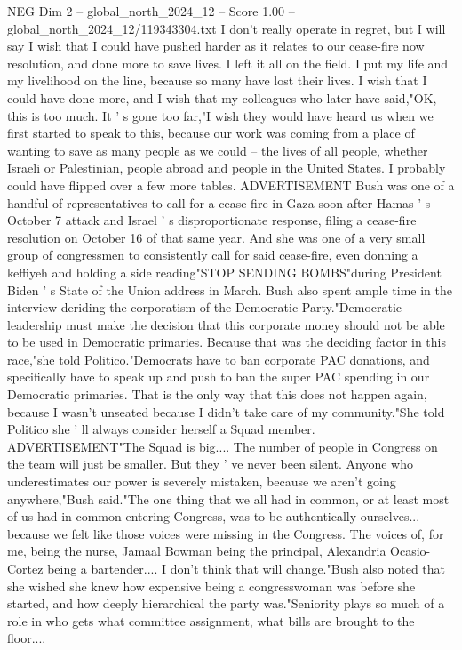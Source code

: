 \begin{textsample}{NEG Dim 2 – global\_north\_2024\_12 – Score 1.00 – global\_north\_2024\_12/119343304.txt}  \label{ex:f2_neg_266}
I don't really operate in regret, but I will say I wish that I could have pushed harder as it relates to our cease-fire now resolution, and done more to save lives.
I left it all on the field.
I put my life and my livelihood on the line, because so many have lost their lives.
I wish that I could have done more, and I wish that my colleagues who later have said,"OK, this is too much.
It ' s gone too far,"I wish they would have heard us when we first started to speak to this, because our work was coming from a place of wanting to save as many people as we could -- the lives of all people, whether Israeli or Palestinian, people abroad and people in the United States.
I probably could have flipped over a few more tables.
ADVERTISEMENT Bush was one of a handful of representatives to call for a cease-fire in Gaza soon after Hamas ' s October 7 attack and Israel ' s disproportionate response, filing a cease-fire resolution on October 16 of that same year.
And she was one of a very small group of congressmen to consistently call for said cease-fire, even donning a keffiyeh and holding a side reading"STOP SENDING BOMBS"during President Biden ' s State of the Union address in March.
Bush also spent ample time in the interview deriding the corporatism of the Democratic Party."Democratic leadership must make the decision that this corporate money should not be able to be used in Democratic primaries.
Because that was the deciding factor in this race,"she told Politico."Democrats have to ban corporate PAC donations, and specifically have to speak up and push to ban the super PAC spending in our Democratic primaries.
That is the only way that this does not happen again, because I wasn't unseated because I didn't take care of my community."She told Politico she ' ll always consider herself a Squad member.
ADVERTISEMENT"The Squad is big....
The number of people in Congress on the team will just be smaller.
But they ' ve never been silent.
Anyone who underestimates our power is severely mistaken, because we aren't going anywhere,"Bush said."The one thing that we all had in common, or at least most of us had in common entering Congress, was to be authentically ourselves... because we felt like those voices were missing in the Congress.
The voices of, for me, being the nurse, Jamaal Bowman being the principal, Alexandria Ocasio-Cortez being a bartender....
I don't think that will change."Bush also noted that she wished she knew how expensive being a congresswoman was before she started, and how deeply hierarchical the party was."Seniority plays so much of a role in who gets what committee assignment, what bills are brought to the floor....

\end{textsample}
